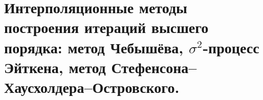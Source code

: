 \section{Интерполяционные методы построения итераций высшего порядка: метод Чебышёва, $\sigma^2$-процесс Эйткена, метод Стефенсона–Хаусхолдера–Островского.}
